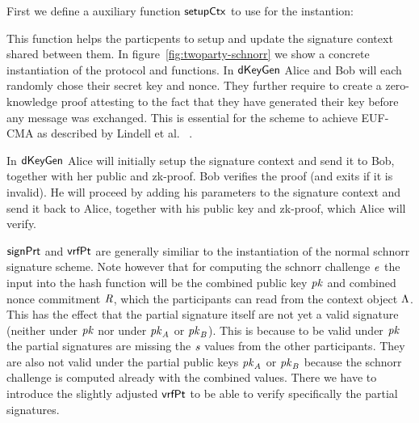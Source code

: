 First we define a auxiliary function $\mathsf{setupCtx}$ to use for the instantion:

\begin{center}
    \fbox{
    \begin{varwidth}{\textwidth}
        \procedure[linenumbering]{$\procSetupCtx{\varSigContext}{\varPubKeyAlice}{\varRandAlice}$} {
        \opAccess{\varSigContext}{\varPubKey} \opAssign \opAccess{\varSigContext}{\varPubKey} \opAddPoint \varPubKeyAlice \\
        \opAccess{\varSigContext}{\varRand} \opAssign \opAccess{\varSigContext}{\varRand} \opAddPoint \varRandAlice \\
        \pcreturn \varSigContext
        } \\
    \end{varwidth}
    }
\end{center}

This function helps the particpents to setup and update the signature context shared between them. In figure~\ref{fig:twoparty-schnorr} we show a concrete instantiation of the protocol and functions. In $\mathsf{dKeyGen}$ Alice
and Bob will each randomly chose their secret key and nonce. They further require to create a zero-knowledge proof attesting to the fact that they have generated their key before any message was exchanged. This
is essential for the scheme to achieve EUF-CMA as described by Lindell et al. ~\cite{lindell2017fast}.

In $\mathsf{dKeyGen}$ Alice will initially setup the signature context and send it to Bob, together with her public and zk-proof.
Bob verifies the proof (and exits if it is invalid). He will proceed by adding his parameters to the signature context and send it back to Alice, together with his public key and zk-proof, which Alice will verify.

$\mathsf{signPrt}$ and $\mathsf{vrfPt}$ are generally similiar to the instantiation of the normal schnorr signature scheme. Note however that for computing the schnorr challenge $\mathit{e}$ the input into
the hash function will be the combined public key $\mathit{pk}$ and combined nonce commitment $\mathit{R}$, which the participants can read from the context object $\Lambda$. This has the effect that the partial
signature itself are not yet a valid signature (neither under $\mathit{pk}$ nor under $\mathit{pk}_{\mathit{A}}$ or $\mathit{pk}_{\mathit{B}}$). This is because to be valid under $\mathit{pk}$ the partial signatures are missing the $\mathit{s}$ values
from the other participants. They are also not valid under the partial public keys $\mathit{pk}_{\mathit{A}}$ or $\mathit{pk}_{\mathit{B}}$ because the schnorr challenge is computed already with the combined values. There we have
to introduce the slightly adjusted $\mathsf{vrfPt}$ to be able to verify specifically the partial signatures.

